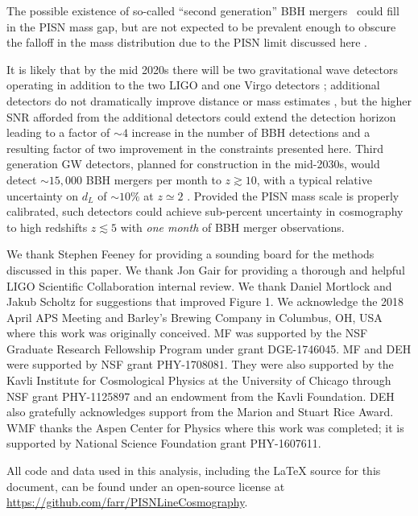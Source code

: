 \documentclass[modern]{aastex62}
\begin{document}
The possible existence of so-called ``second generation'' \ac{BBH} mergers~\citep[mergers where one black hole is itself a merger product, see e.g.][]{2017ApJ...840L..24F} could fill in the
\ac{PISN} mass gap, but are not expected to be prevalent enough to obscure the
falloff in the mass distribution due to the \ac{PISN} limit discussed here
\citep{Rodriguez2019}.

It is likely that by the mid 2020s there will be two gravitational wave
detectors operating in addition to the two LIGO and one Virgo detectors
\citep{ObsScenarios}; additional detectors do not dramatically improve distance
or mass estimates \citep{Vitale2017}, but the higher SNR afforded from the
additional detectors could extend the detection horizon leading to a factor of
$\sim 4$ increase in the number of \ac{BBH} detections and a resulting factor of
two improvement in the constraints presented here.  Third generation \ac{GW}
detectors, planned for construction in the mid-2030s, would detect $\sim 15,000$
\ac{BBH} mergers per month to $z \gtrsim 10$, with a typical relative
uncertainty on $d_L$ of $\sim 10 \%$ at $z \simeq 2$ \citep{Vitale2018}.
Provided the \ac{PISN} mass scale is properly calibrated, such detectors could
achieve sub-percent uncertainty in cosmography to high redshifts $z \lesssim 5$
with \emph{one month} of \ac{BBH} merger observations.

\acknowledgments

We thank Stephen Feeney for providing a sounding board for the methods discussed
in this paper.  We thank Jon Gair for providing a thorough and helpful LIGO
Scientific Collaboration internal review.  We thank Daniel Mortlock and Jakub
Scholtz for suggestions that improved Figure 1.  We acknowledge the 2018 April
APS Meeting and Barley's Brewing Company in Columbus, OH, USA where this work
was originally conceived. MF was supported by the NSF Graduate Research
Fellowship Program under grant DGE-1746045. MF and DEH were supported by  NSF
grant PHY-1708081. They were also supported by the Kavli Institute for
Cosmological Physics at the University of Chicago through NSF grant PHY-1125897
and an endowment from the Kavli Foundation. DEH also gratefully acknowledges
support from the Marion and Stuart Rice Award.  WMF thanks the Aspen Center for
Physics where this work was completed; it is supported by National Science
Foundation grant PHY-1607611.

All code and data used in this analysis, including the \LaTeX{} source for this
document, can be found under an open-source license at
\url{https://github.com/farr/PISNLineCosmography}.
\end{document}
